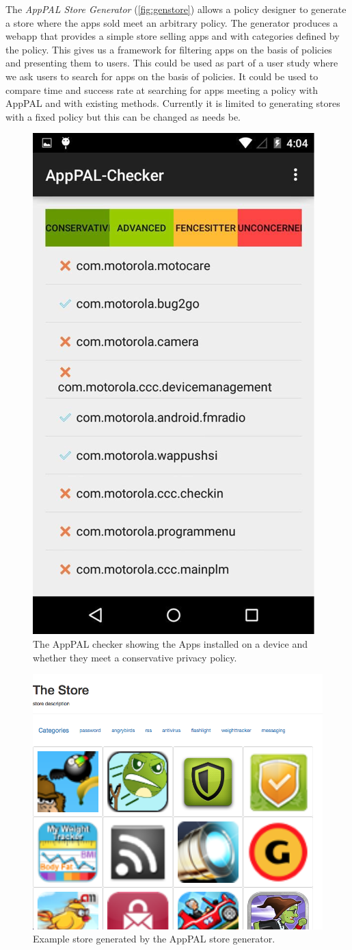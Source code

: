 \documentclass{scrartcl}
\begin{document}
The \emph{AppPAL Store Generator} (\autoref{fig:genstore}) allows a policy designer to generate a store where the apps sold meet an arbitrary policy.
The generator produces a webapp that provides a simple store selling apps and with categories defined by the policy.
This gives us a framework for filtering apps on the basis of policies and presenting them to users.
This could be used as part of a user study where we ask users to search for apps on the basis of policies.
It could be used to compare time and success rate at searching for apps meeting a policy with AppPAL and with existing methods.
Currently it is limited to generating stores with a fixed policy but this can be changed as needs be.

\begin{figure}\centering
  \includegraphics[width=0.3\linewidth]{./images/apppal-checker.png}
  \caption{The AppPAL checker showing the Apps installed on a device and whether they meet a conservative privacy policy.}
  \label{fig:apppal-checker}
\end{figure}
\begin{figure}\centering
  \includegraphics[width=0.7\linewidth]{./images/genstore.png}
  \caption{Example store generated by the AppPAL store generator.}
  \label{fig:genstore}
\end{figure}
\end{document}
